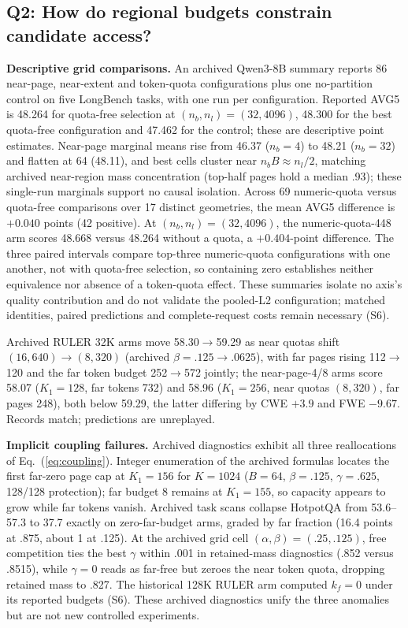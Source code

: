 \documentclass[conference,9pt,letterpaper]{IEEEtran}
\begin{document}
\subsection{Q2: How do regional budgets constrain candidate access?}
\textbf{Descriptive grid comparisons.} An archived Qwen3-8B summary reports 86 near-page, near-extent and token-quota configurations plus one no-partition control on five LongBench tasks, with one run per configuration. Reported AVG5 is 48.264 for quota-free selection at $(n_b,n_l)=(32,4096)$, 48.300 for the best quota-free configuration and 47.462 for the control; these are descriptive point estimates. Near-page marginal means rise from 46.37 ($n_b{=}4$) to 48.21 ($n_b{=}32$) and flatten at 64 (48.11), and best cells cluster near $n_bB\approx n_l/2$, matching archived near-region mass concentration (top-half pages hold a median .93); these single-run marginals support no causal isolation. Across 69 numeric-quota versus quota-free comparisons over 17 distinct geometries, the mean AVG5 difference is $+0.040$ points (42 positive). At $(n_b,n_l)=(32,4096)$, the numeric-quota-448 arm scores 48.668 versus 48.264 without a quota, a $+0.404$-point difference. The three paired intervals compare top-three numeric-quota configurations with one another, not with quota-free selection, so containing zero establishes neither equivalence nor absence of a token-quota effect. These summaries isolate no axis's quality contribution and do not validate the pooled-L2 configuration; matched identities, paired predictions and complete-request costs remain necessary (S6).

Archived RULER 32K arms move 58.30$\rightarrow$59.29 as near quotas shift $(16,640)\rightarrow(8,320)$ (archived $\beta=.125\!\rightarrow\!.0625$), with far pages rising 112$\rightarrow$120 and the far token budget 252$\rightarrow$572 jointly; the near-page-4/8 arms score 58.07 ($K_1=128$, far tokens 732) and 58.96 ($K_1=256$, near quotas $(8,320)$, far pages 248), both below 59.29, the latter differing by CWE $+3.9$ and FWE $-9.67$. Records match; predictions are unreplayed.

\textbf{Implicit coupling failures.} Archived diagnostics exhibit all three reallocations of Eq.~(\ref{eq:coupling}). Integer enumeration of the archived formulas locates the first far-zero page cap at $K_1=156$ for $K=1024$ ($B=64$, $\beta=.125$, $\gamma=.625$, 128/128 protection); far budget 8 remains at $K_1=155$, so capacity appears to grow while far tokens vanish. Archived task scans collapse HotpotQA from 53.6--57.3 to 37.7 exactly on zero-far-budget arms, graded by far fraction (16.4 points at .875, about 1 at .125). At the archived grid cell $(\alpha,\beta)=(.25,.125)$, free competition ties the best $\gamma$ within .001 in retained-mass diagnostics (.852 versus .8515), while $\gamma=0$ reads as far-free but zeroes the near token quota, dropping retained mass to .827. The historical 128K RULER arm computed $k_f=0$ under its reported budgets (S6). These archived diagnostics unify the three anomalies but are not new controlled experiments.
\end{document}
